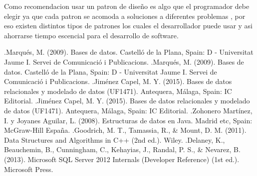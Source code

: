 \documentclass[twoside,twocolumn]{article}
\begin{document}
Como recomendacion usar un patron de diseño es algo que el programador
debe elegir ya que cada patron se acomoda a soluciones a diferentes problemas 
, por eso existen distintos tipos de patrones los cuales el desarrollador puede usar y
 asi ahorrarse tiempo escencial para el desarrollo de software.
 
 
\begin{thebibliography}{99} %

\bibitem
[1].Marqués, M. (2009). Bases de datos. Castelló de la Plana, Spain: D - Universitat Jaume I. Servei de Comunicació i Publicacions. 
\bibitem
[2].Marqués, M. (2009). Bases de datos. Castelló de la Plana, Spain: D - Universitat Jaume I. Servei de Comunicació i Publicacions.  
\bibitem
[3].Jiménez Capel, M. Y. (2015). Bases de datos relacionales y modelado de datos (UF1471). Antequera, Málaga, Spain: IC Editorial. 
\bibitem
[4].Jiménez Capel, M. Y. (2015). Bases de datos relacionales y modelado de datos (UF1471). Antequera, Málaga, Spain: IC Editorial. 
\bibitem
[5].Zohonero Martínez, I. y Joyanes Aguilar, L. (2008). Estructuras de datos en Java. Madrid etc, Spain: McGraw-Hill España.
\bibitem
[6].Goodrich, M. T., Tamassia, R., \& Mount, D. M. (2011). Data Structures and Algorithms in C++ (2nd ed.). Wiley.
\bibitem
[7].Delaney, K., Beauchemin, B., Cunningham, C., Kehayias, J., Randal, P. S., \& Nevarez, B. (2013). Microsoft SQL Server 2012 Internals (Developer Reference) (1st ed.). Microsoft Press.
\end{thebibliography}

\end{document}
